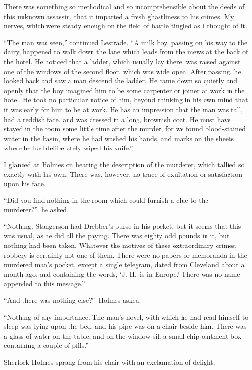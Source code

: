 \documentclass[12pt,english]{book}
\begin{document}
There was something so methodical and so incomprehensible about the
deeds of this unknown assassin, that it imparted a fresh ghastliness
to his crimes. My nerves, which were steady enough on the field of
battle tingled as I thought of it.

{}``The man was seen,'' continued Lestrade. {}``A milk boy, passing
on his way to the dairy, happened to walk down the lane which leads
from the mews at the back of the hotel. He noticed that a ladder,
which usually lay there, was raised against one of the windows of
the second floor, which was wide open. After passing, he looked back
and saw a man descend the ladder. He came down so quietly and openly
that the boy imagined him to be some carpenter or joiner at work in
the hotel. He took no particular notice of him, beyond thinking in
his own mind that it was early for him to be at work. He has an impression
that the man was tall, had a reddish face, and was dressed in a long,
brownish coat. He must have stayed in the room some little time after
the murder, for we found blood-stained water in the basin, where he
had washed his hands, and marks on the sheets where he had deliberately
wiped his knife.''

I glanced at Holmes on hearing the description of the murderer, which
tallied so exactly with his own. There was, however, no trace of exultation
or satisfaction upon his face.

{}``Did you find nothing in the room which could furnish a clue to
the murderer?''\ he asked.

{}``Nothing. Stangerson had Drebber's purse in his pocket, but it
seems that this was usual, as he did all the paying. There was eighty
odd pounds in it, but nothing had been taken. Whatever the motives
of these extraordinary crimes, robbery is certainly not one of them.
There were no papers or memoranda in the murdered man's pocket, except
a single telegram, dated from Cleveland about a month ago, and containing
the words, `J. H.\ is in Europe.' There was no name appended to this
message.''

{}``And there was nothing else?''\ Holmes asked.

{}``Nothing of any importance. The man's novel, with which he had
read himself to sleep was lying upon the bed, and his pipe was on
a chair beside him. There was a glass of water on the table, and on
the window-sill a small chip ointment box containing a couple of pills.''

Sherlock Holmes sprang from his chair with an exclamation of delight.
\end{document}
